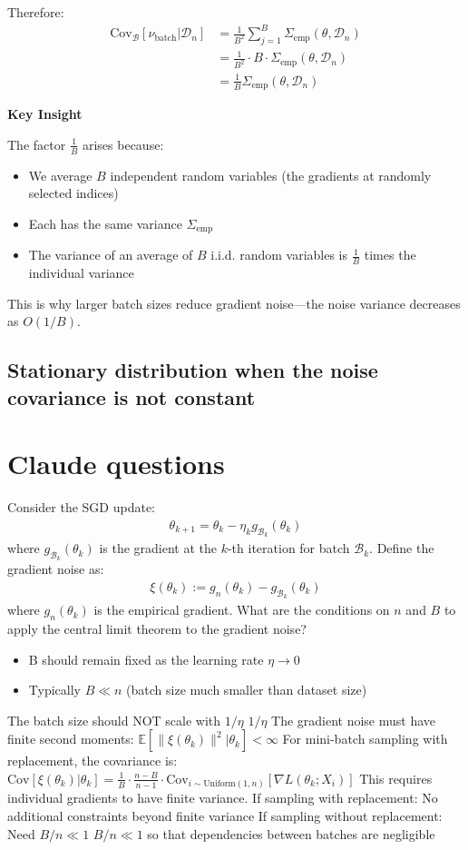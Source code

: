 \documentclass[11pt]{article}
\begin{document}
Therefore:
\begin{align}
\text{Cov}_{\mathcal{B}}[\nu_{\text{batch}} | \mathcal{D}_n] &= \frac{1}{B^2} \sum_{j=1}^B \Sigma_{\text{emp}}(\theta, \mathcal{D}_n) \\
&= \frac{1}{B^2} \cdot B \cdot \Sigma_{\text{emp}}(\theta, \mathcal{D}_n) \\
&= \frac{1}{B} \Sigma_{\text{emp}}(\theta, \mathcal{D}_n)
\end{align}

\textbf{Key Insight}

The factor $\frac{1}{B}$ arises because:
\begin{itemize}
    \item We average $B$ independent random variables (the gradients at randomly selected indices)
    \item Each has the same variance $\Sigma_{\text{emp}}$
    \item The variance of an average of $B$ i.i.d. random variables is $\frac{1}{B}$ times the individual variance
\end{itemize}

This is why larger batch sizes reduce gradient noise—the noise variance decreases as $O(1/B)$.

\subsection{Stationary distribution when the noise covariance is not constant}
\section{Claude questions}

Consider the SGD update:
\begin{align}
\theta_{k+1} = \theta_k - \eta_k g_{\mathcal{B}_k}(\theta_k)
\end{align}
where $g_{\mathcal{B}_k}(\theta_k)$ is the gradient at the $k$-th iteration for batch $\mathcal{B}_k$.
Define the gradient noise as:
\begin{align}
\xi(\theta_k) := g_n(\theta_k) - g_{\mathcal{B}_k}(\theta_k)
\end{align}
where $g_n(\theta_k)$ is the empirical gradient.
What are the conditions on $n$ and $B$ to apply the central limit theorem to the gradient noise?
\begin{itemize}
    \item B should remain fixed as the learning rate $\eta \to 0$
    \item Typically $B \ll n$ (batch size much smaller than dataset size)
\end{itemize}
The batch size should NOT scale with $1/\eta$
$1/\eta$
The gradient noise must have finite second moments:
$\mathbb{E}[\|\xi(\theta_k)\|^2 | \theta_k] < \infty$
For mini-batch sampling with replacement, the covariance is:
$\text{Cov}[\xi(\theta_k) | \theta_k] = \frac{1}{B} \cdot \frac{n-B}{n-1} \cdot \text{Cov}_{i \sim \text{Uniform}(1,n)}[\nabla L(\theta_k; X_i)]$
This requires individual gradients to have finite variance.
If sampling with replacement: No additional constraints beyond finite variance
If sampling without replacement: Need $B/n \ll 1$
$B/n \ll 1$ so that dependencies between batches are negligible
\end{document}
